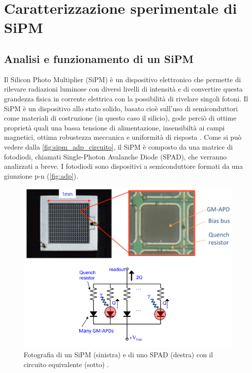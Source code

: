 \chapter{Caratterizzazione sperimentale di SiPM}\label{caratterizzazione_sipm}
\section{Analisi e funzionamento di un SiPM}
Il Silicon Photo Multiplier (SiPM) è un dispositivo elettronico che permette di rilevare radiazioni luminose con diversi livelli di intensità 
e di convertire questa grandezza fisica in corrente elettrica con la possibilità di rivelare singoli fotoni. Il SiPM è un dispositivo allo stato solido, basato cioè sull'uso di semiconduttori come materiali di costruzione 
(in questo caso il silicio), gode perciò di ottime proprietà quali una bassa tensione di alimentazione, insensibiltà ai campi magnetici, ottima 
robustezza meccanica e uniformità di risposta \cite{semiconductorcomponentsindustriesllc2011_2023_and9770}.
Come si può vedere dalla \autoref*{fig:sipm_adp_circuito}, il SiPM è composto da una matrice di fotodiodi, chiamati Single-Photon Avalanche Diode
(SPAD), che verranno analizzati a breve. I fotodiodi sono dispositivi a semiconduttore formati da una giunzione p-n (\autoref*{fig:adp}).
\begin{figure}[h!]
    \centering
    \includegraphics[width=.75\linewidth]{img/sipm_adp_circuito.png}
    \caption{Fotografia di un SiPM (sinistra) e di uno SPAD (destra) con il circuito equivalente (sotto) \cite{linssen_2023_eurizon}.}
    \label{fig:sipm_adp_circuito}
\end{figure}
